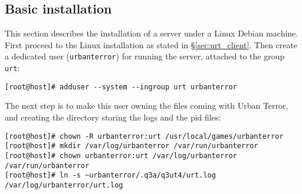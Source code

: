 % 
%
%
%
%

\subsection{Basic installation}
\label{sec:server:install}

This section describes the installation of a server under a Linux Debian
machine. 
First proceed to the Linux installation as stated in \S\ref{sec:urt_client}. 
Then create a dedicated user (\texttt{urbanterror}) for running the server,
attached to the group \texttt{urt}: 
\begin{lstlisting}[style=command]
[root@host]# adduser --system --ingroup urt urbanterror
\end{lstlisting}
The next step is to make this user owning the files coming with Urban Terror,
and creating the directory storing the logs and the pid files: 
\begin{lstlisting}[style=command]
[root@host]# chown -R urbanterror:urt /usr/local/games/urbanterror
[root@host]# mkdir /var/log/urbanterror /var/run/urbanterror
[root@host]# chown urbanterror:urt /var/log/urbanterror /var/run/urbanterror
[root@host]# ln -s ~urbanterror/.q3a/q3ut4/urt.log  /var/log/urbanterror/urt.log
\end{lstlisting}

